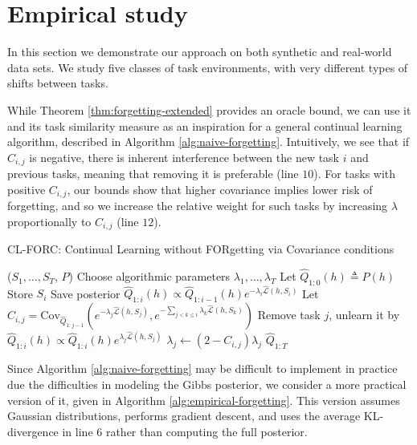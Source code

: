 \documentclass{article}
\theoremstyle{plain}
\theoremstyle{definition}
\theoremstyle{remark}
\begin{document}
\section{Empirical study}

In this section we demonstrate our approach on both synthetic and real-world data sets. We study five classes of task environments, with very different types of shifts between tasks.

While Theorem \ref{thm:forgetting-extended} provides an oracle bound, we can use it and its task similarity measure as an inspiration for a general continual learning algorithm, described in Algorithm \ref{alg:naive-forgetting}. Intuitively, we see that if $C_{i,j}$ is negative, there is inherent interference between the new task $i$ and previous tasks, meaning that removing it is preferable (line $10$). For tasks with positive $C_{i,j}$, our bounds show that higher covariance implies lower risk of forgetting, and so we increase the relative weight for such tasks by increasing $\lambda$ proportionally to $C_{i,j}$ (line $12$).

\begin{algorithm}[H]
	\caption{CL-FORC: Continual Learning without FORgetting via Covariance conditions}
	\label{alg:naive-forgetting}
	\small
	\begin{algorithmic}[1]
		 ($S_1,\ldots, S_T$, $P$)
		\STATE Choose algorithmic parameters $\lambda_1,\ldots, \lambda_T$
		\STATE Let $\hat{Q}_{1:0}(h) \triangleq P(h)$
		\STATE Store $S_i$
            \STATE Save posterior $\hat{Q}_{1:i}(h)\propto \hat{Q}_{1:i-1}(h)e^{-\lambda_i \hat{\mathcal{L}}(h,S_i)}$
		\STATE Let $C_{i,j}=\textrm{Cov}_{\hat{Q}_{1:j-1}}(e^{-\lambda_j \hat{\mathcal{L}}(h,S_j)}, e^{-\sum_{j< k\leq i}\lambda_k \hat{\mathcal{L}}(h,S_k)})$
                \STATE Remove task $j$, unlearn it by $\hat{Q}_{1:i}(h)\propto \hat{Q}_{1:i}(h)e^{\lambda_j \hat{\mathcal{L}}(h,S_j)}$
                    \STATE $\lambda_j \leftarrow (2-C_{i,j})\lambda_j$ 
                \ENDIF
		\ENDFOR 
		\ENDFOR
		 $\hat{Q}_{1:T}$
	\end{algorithmic}
\end{algorithm}

Since Algorithm \ref{alg:naive-forgetting} may be difficult to implement in practice due the difficulties in modeling the Gibbs posterior, we consider a more practical version of it, given in Algorithm \ref{alg:empirical-forgetting}. This version assumes Gaussian distributions, performs gradient descent, and uses the average KL-divergence in line $6$ rather than computing the full posterior.  
\end{document}
